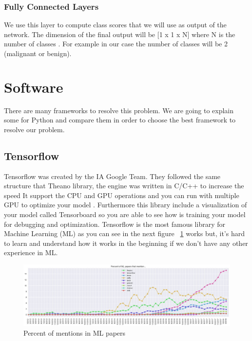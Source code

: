 \subsubsection[Fully Connected Layers]{Fully Connected Layers}
We use this layer to compute class scores that we will use as output of the network. The dimension of the final output will be [1 x 1 x N] where N is the number of classes \cite{starteddeeplearning}. For example in our case the number of classes will be 2 (malignant or benign).




\section{Software}
There are many frameworks to resolve this problem. We are going to explain some for Python and compare them in order to choose the best framework to resolve our problem. 

\subsection[Tensorflow]{Tensorflow}
Tensorflow was created by the IA Google Team. They followed the same structure that Theano library, the engine was written in C/C++ to increase the speed \cite{generalcomparaison}
It support the CPU and GPU operations and you can run with multiple  GPU to optimize your model \cite{tensorflow}. Furthermore this library include a visualization of your model called Tensorboard so you are able to see how is training your model for debugging and optimization. Tensorflow is the most famous library for Machine Learning (ML) as you can see in the next figure ~\ref{fig:mentionsframeworks} works but, it's hard to learn and understand how it works in the beginning if we don't have any other experience in ML.


\begin{figure}[H]
\centering
\includegraphics[width=1\textwidth]{./figures/libraries}
\caption{Percent of mentions in ML papers \cite{ml-mentions-image}}
\label{fig:mentionsframeworks}
\end{figure}


